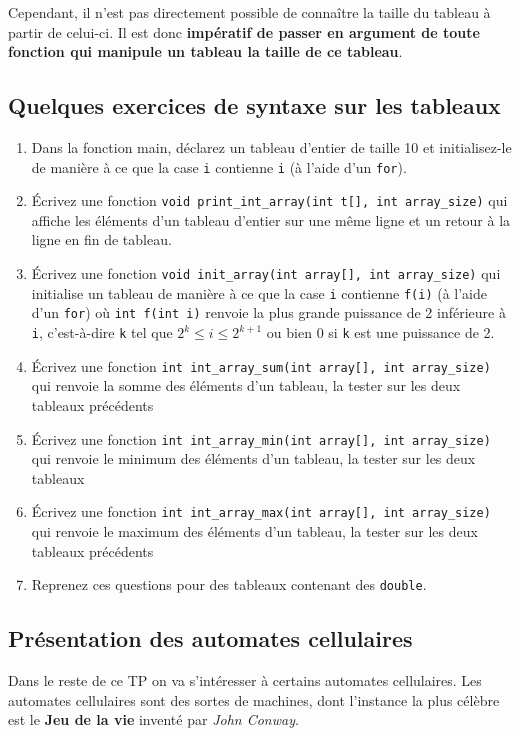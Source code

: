 \documentclass[11pt]{article}
\begin{document}
Cependant, il n'est pas directement possible de connaître la taille du tableau à partir de celui-ci. Il est donc \textbf{impératif de passer en argument de toute fonction qui manipule un tableau la taille de ce tableau}.

\subsection{Quelques exercices de syntaxe sur les tableaux}
\label{sec:org9f8f857}
\begin{enumerate}
\item Dans la fonction main, déclarez un tableau d'entier de taille 10 et initialisez-le de manière à ce que la case \texttt{i} contienne \texttt{i} (à l'aide d'un \texttt{for}).
\item Écrivez une fonction \texttt{void print\_int\_array(int t[], int array\_size)} qui affiche les éléments d'un tableau d'entier sur une même ligne et un retour à la ligne en fin de tableau.
\item Écrivez une fonction \texttt{void init\_array(int array[], int array\_size)} qui initialise un tableau de manière à ce que la case \texttt{i} contienne \texttt{f(i)} (à l'aide d'un \texttt{for}) où \texttt{int f(int i)} renvoie la plus grande puissance de 2 inférieure à \texttt{i}, c'est-à-dire \texttt{k} tel que \(2^k \leq i \leq 2^{k+1}\) ou bien 0 si \texttt{k} est une puissance de 2.
\item Écrivez une fonction \texttt{int int\_array\_sum(int array[], int array\_size)} qui renvoie la somme des éléments d'un tableau, la tester sur les deux tableaux précédents
\item Écrivez une fonction \texttt{int int\_array\_min(int array[], int array\_size)} qui renvoie le minimum des éléments d'un tableau, la tester sur les deux tableaux
\item Écrivez une fonction \texttt{int int\_array\_max(int array[], int array\_size)} qui renvoie le maximum des éléments d'un tableau, la tester sur les deux tableaux précédents
\item Reprenez ces questions pour des tableaux contenant des \texttt{double}.
\end{enumerate}
\subsection{Présentation des automates cellulaires}
\label{sec:orgda2c638}
Dans le reste de ce TP on va s'intéresser à certains automates cellulaires. Les automates cellulaires sont des sortes de machines, dont l'instance la plus célèbre est le \textbf{Jeu de la vie} inventé par \emph{John Conway}.
\end{document}
